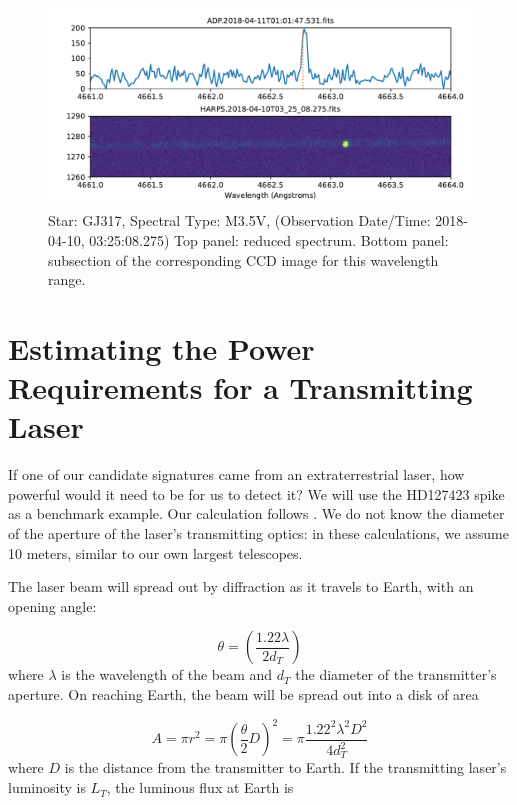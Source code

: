 \documentclass[twocolumn]{aastex701}
\begin{document}
\begin{figure}
    \centering  \includegraphics[width=\textwidth]{clean-figures/seti_candidate_GJ317.pdf}
    \caption{Star: GJ317, Spectral Type: M3.5V, (Observation Date/Time: 2018-04-10, 03:25:08.275) Top panel: reduced spectrum. Bottom panel: subsection of the corresponding CCD image for this wavelength range.}
    \label{fig:seti_candidate_GJ317}
\end{figure}

\section{Estimating the Power Requirements for a Transmitting Laser}
If one of our candidate signatures came from an extraterrestrial laser, how powerful would it need to be for us to detect it?  We will use the HD127423 spike as a benchmark example.  Our calculation follows \cite{Lipman_2019}.  We do not know the diameter of the aperture of the laser's transmitting optics: in these calculations, we assume 10 meters, similar to our own largest telescopes.

The laser beam will spread out by diffraction as it travels to Earth, with an opening angle:

\begin{equation}
    \theta = (\frac{1.22\lambda}{2d_T})
\end{equation}
where $\lambda$ is the wavelength of the beam and $d_T$ the diameter of the transmitter's aperture.  On reaching Earth, the beam will be spread out into a disk of area

\begin{equation}
    A = \pi r^2 = \pi (\frac{\theta}{2} D)^2 = \pi \frac{1.22^2 \lambda^2 D^2}{4 d_T^2}
\end{equation}
where $D$ is the distance from the transmitter to Earth.  If the transmitting laser's luminosity is $L_T$, the luminous flux at Earth is
\end{document}
